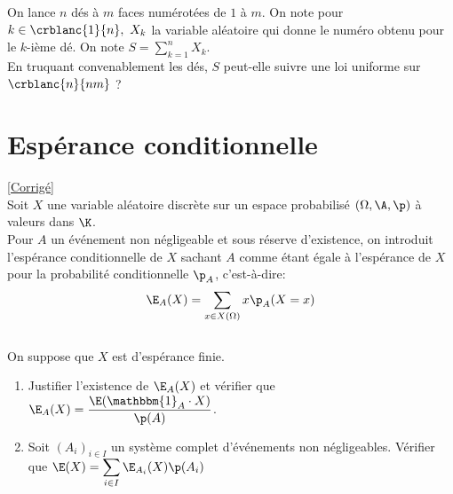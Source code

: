 \documentclass[8pt]{book}
\begin{document}
On lance $n$ dés à $m$ faces numérotées de $1$ à $m$. On note pour $k\in \crblanc{1}{n},\ X_k$ la variable aléatoire qui donne le numéro obtenu pour le $k$-ième dé. On note $S=\displaystyle\sum_{k=1}^nX_k$.\\
En truquant convenablement les dés, $S$ peut-elle suivre une loi uniforme sur $\crblanc{n}{nm}$ ?

\section{Espérance conditionnelle }
\label{Espérance conditionnelle}
\textcolor{blue}{\hyperref[Espérance conditionnelle corrigé]{[Corrigé]}}\\
Soit $X$ une variable aléatoire discrète sur un espace probabilisé $(\Omega,\A,\p)$ à valeurs dans $\K$.
\\Pour $A$ un événement non négligeable et sous réserve d'existence, on introduit l'espérance conditionnelle de $X$ sachant $A$ comme étant égale à l'espérance de $X$ pour la probabilité conditionnelle $\p_A$, c'est-à-dire: $$\E_A(X)=\displaystyle\sum\limits_{x\in X(\Omega)} x\p_A(X=x)$$
\\On suppose que $X$ est d'espérance finie.
\begin{enumerate}
	\item Justifier l'existence de $\E_A(X)$ et vérifier que $\E_A(X)=\displaystyle\frac{\E(\mathbbm{1}_A\cdot X)}{\p(A)}$.
	\item Soit $(A_i)_{i\in I}$ un système complet d'événements non négligeables. Vérifier que $\E(X)=\displaystyle\sum\limits_{i\in I}\E_{A_i}(X)\p(A_i)$
\end{enumerate}
\end{document}
